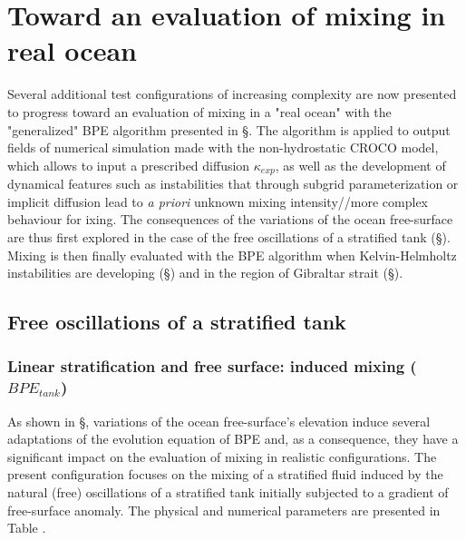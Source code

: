 \section{Toward an evaluation of mixing in real ocean}
\label{section_CROCO_BPE}
Several additional test configurations of increasing complexity are now presented to progress toward an evaluation of mixing in a "real ocean" with the "generalized" BPE algorithm presented in \S {}. \color{red}The algorithm is applied to output fields of numerical simulation made with the non-hydrostatic CROCO model, which allows to input a prescribed diffusion $\kappa_{exp}$, as well as the development of dynamical features such as instabilities that through subgrid parameterization or implicit diffusion lead to \textit{a priori} unknown mixing intensity//more complex behaviour for ixing.\color{black} The consequences of the variations of the ocean free-surface are thus first explored in the case of the free oscillations of a stratified tank (\S {}). Mixing is then finally evaluated with the BPE algorithm when Kelvin-Helmholtz instabilities are developing (\S {}) and in the region of Gibraltar strait (\S {}).

\subsection{Free oscillations of a stratified tank}
\label{section_BPE_tank}
\subsubsection{Linear stratification and free surface: induced mixing ($BPE_{tank}$)}

As shown in \S {}, variations of the ocean free-surface's elevation induce several adaptations of the evolution equation of BPE and, as a consequence, they have a significant impact on the evaluation of mixing in realistic configurations. The present configuration focuses on the mixing of a stratified fluid induced by the natural (free) oscillations of a stratified tank initially subjected to a gradient of free-surface anomaly. The physical and numerical parameters are presented in Table .

